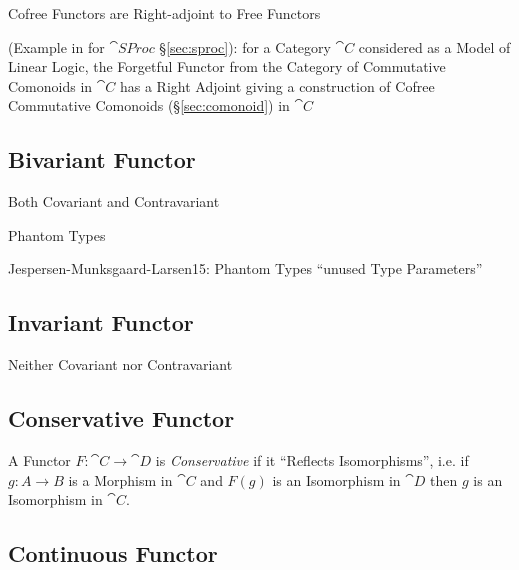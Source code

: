 Cofree Functors are Right-adjoint to Free Functors

(Example in \cite{abramsky-gay-nagarajan96} for $\cat{SProc}$
\S\ref{sec:sproc}): for a Category $\cat{C}$ considered as a Model of
Linear Logic, the Forgetful Functor from the Category of Commutative
Comonoids in $\cat{C}$ has a Right Adjoint giving a construction of
Cofree Commutative Comonoids (\S\ref{sec:comonoid}) in $\cat{C}$



\subsection{Bivariant Functor} \label{sec:bivariant_functor}

Both Covariant and Contravariant

Phantom Types %

Jespersen-Munksgaard-Larsen15: Phantom Types ``unused Type
Parameters''



\subsection{Invariant Functor} \label{sec:invariant_functor}

Neither Covariant nor Contravariant



\subsection{Conservative Functor}\label{sec:conservative_functor}

A Functor $F : \cat{C} \rightarrow \cat{D}$ is
\emph{Conservative} if it ``Reflects Isomorphisms'', i.e. if $g : A
\rightarrow B$ is a Morphism in $\cat{C}$ and $F(g)$ is an
Isomorphism in $\cat{D}$ then $g$ is an Isomorphism in
$\cat{C}$.



\subsection{Continuous Functor}\label{sec:continuous_functor}

